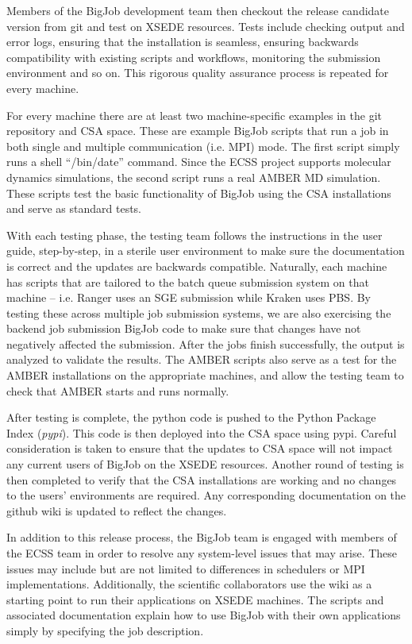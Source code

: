 \documentclass{sig-alternate}
\begin{document}
Members of the BigJob development team then checkout the release candidate
version from git and test on XSEDE resources. Tests include checking output and error logs, 
ensuring that the installation is seamless, ensuring backwards compatibility with existing 
scripts and workflows, monitoring the submission environment and so on. This rigorous quality 
assurance process is repeated for every machine.

For every machine there are at least two machine-specific examples in the
git repository and CSA space. These are example BigJob scripts that
run a job in both single and multiple communication (i.e. MPI)
mode. The first script simply runs a shell ``/bin/date''
command. Since the ECSS project supports molecular dynamics
simulations, the second script runs a real AMBER MD simulation. These
scripts test the basic functionality of BigJob using the CSA
installations and serve as standard tests.

With each testing phase, the testing team follows the instructions in the user
guide, step-by-step, in a sterile user environment to make sure the
documentation is correct and the updates are backwards compatible.
Naturally, each machine has scripts that are tailored to the batch queue submission
system on that machine -- i.e. Ranger uses an SGE submission while Kraken uses
PBS. By testing these across multiple job submission systems, we are also
exercising the backend job submission BigJob code to make sure that changes have
not negatively affected the submission. After the jobs finish successfully, the
output is analyzed to validate the results. The AMBER scripts also serve as a
test for the AMBER installations on the appropriate machines, and allow the
testing team to check that AMBER starts and runs normally.

After testing is complete, the python code is pushed to the Python Package Index
(\textit{pypi}). This code is then deployed into the CSA space using pypi.
Careful consideration is taken to ensure that the updates to CSA space
will not impact any current users of BigJob on the XSEDE resources. Another round of testing 
is then completed to verify that the CSA installations are working and no changes to 
the users' environments are required. Any corresponding documentation on the 
github wiki is updated to reflect the changes.

In addition to this release process, the BigJob team is engaged with members
of the ECSS team in order to resolve any system-level issues that may arise.
These issues may include but are not limited to differences in schedulers or MPI
implementations. Additionally, the scientific collaborators use the wiki as a
starting point to run their applications on XSEDE machines. The scripts and
associated documentation explain how to use BigJob with their own applications
simply by specifying the job description. 
\end{document}
